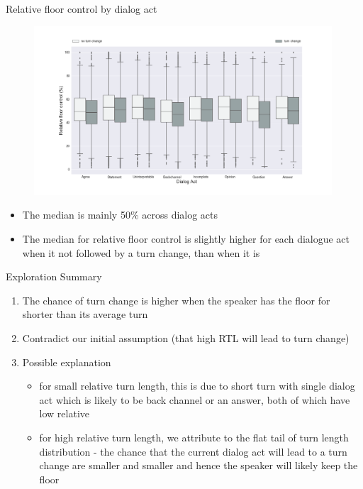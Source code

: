 \begin{frame}{Relative floor control by dialog act}
\begin{minipage}{0.8\textwidth}
\begin{figure}[H]
\centering
\includegraphics[width=30em]{../scikitlearn/figures/f4.png}\vspace{-1em}
\end{figure}
\end{minipage}
\begin{minipage}{0.8\textwidth}
\begin{itemize}
\item \small{The median is mainly 50\% across dialog acts}
\item \small{The median for relative floor control is slightly higher for each
dialogue act when it not followed by a turn change, than when it is}
\end{itemize}
\end{minipage}
\end{frame}


\begin{frame}{Exploration Summary}
 \begin{enumerate}[<+->]\itemsep9pt
          \item The chance of turn change is higher when the speaker has the floor for shorter than its average turn
          \item Contradict our initial assumption (that high RTL will lead to turn change)
          \item Possible explanation
                \begin{itemize}
                    \item for small relative turn length, this is due to short turn with single dialog act which is likely to be back channel or an answer, both of which have low relative
                     \item for high relative turn length, we attribute to the flat tail of turn length distribution - the chance that the current dialog act will lead to a turn change are smaller and smaller and hence the speaker will likely keep the floor
                \end{itemize}
  \end{enumerate}
\end{frame}

